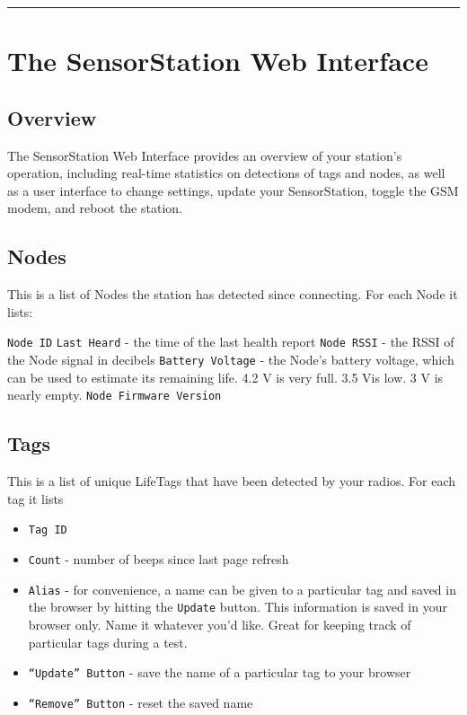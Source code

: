 \documentclass[
]{article}
\providecommand{\tightlist}{%
  \setlength{\itemsep}{0pt}\setlength{\parskip}{0pt}}
\begin{document}
\begin{center}\rule{0.5\linewidth}{0.5pt}\end{center}

\hypertarget{the-sensorstation-web-interface}{%
\section{The SensorStation Web
Interface}\label{the-sensorstation-web-interface}}

\hypertarget{overview}{%
\subsection{Overview}\label{overview}}

The SensorStation Web Interface provides an overview of your station's
operation, including real-time statistics on detections of tags and
nodes, as well as a user interface to change settings, update your
SensorStation, toggle the GSM modem, and reboot the station.

\hypertarget{nodes}{%
\subsection{Nodes}\label{nodes}}

This is a list of Nodes the station has detected since connecting. For
each Node it lists:

\texttt{Node\ ID} \texttt{Last\ Heard} - the time of the last health
report \texttt{Node\ RSSI} - the RSSI of the Node signal in decibels
\texttt{Battery\ Voltage} - the Node's battery voltage, which can be
used to estimate its remaining life. 4.2 V is very full. 3.5 Vis low. 3
V is nearly empty. \texttt{Node\ Firmware\ Version}

\hypertarget{tags}{%
\subsection{Tags}\label{tags}}

This is a list of unique LifeTags that have been detected by your
radios. For each tag it lists

\begin{itemize}
\tightlist
\item
  \texttt{Tag\ ID}
\item
  \texttt{Count} - number of beeps since last page refresh
\item
  \texttt{Alias} - for convenience, a name can be given to a particular
  tag and saved in the browser by hitting the \texttt{Update} button.
  This information is saved in your browser only. Name it whatever you'd
  like. Great for keeping track of particular tags during a test.
\item
  \texttt{“Update”\ Button} - save the name of a particular tag to your
  browser
\item
  \texttt{“Remove”\ Button} - reset the saved name
\end{itemize}
\end{document}
